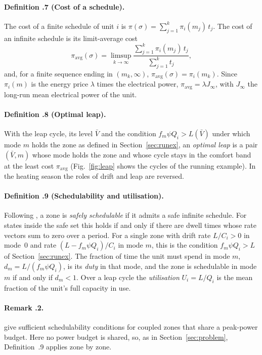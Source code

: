 \documentclass[10pt,a4paper,twocolumn]{article}
\theoremstyle{definition}
\begin{document}
\paragraph{Definition \thesection.7 (Cost of a schedule).} The cost of a finite schedule of unit $i$ is $\pi(\sigma)=\sum_{j=1}^k\pi_i(m_j)\,t_j$. The cost of an infinite schedule is its limit-average cost
\begin{equation*}
\pi_{\mathrm{avg}}(\sigma)=\limsup_{k\to\infty}\frac{\sum_{j=1}^k\pi_i(m_j)\,t_j}{\sum_{j=1}^kt_j},
\end{equation*}
and, for a finite sequence ending in $(m_k,\infty)$, $\pi_{\mathrm{avg}}(\sigma)=\pi_i(m_k)$. Since $\pi_i(m)$ is the energy price $\lambda$ times the electrical power, $\pi_{\mathrm{avg}}=\lambda J_\infty$, with $J_\infty$ the long-run mean electrical power of the unit.

\paragraph{Definition \thesection.8 (Optimal leap).} With the leap cycle, its level $\bar V$ and the condition $f_m\psi Q_i>L(\bar V)$ under which mode $m$ holds the zone as defined in Section~\ref{sec:runex}, an \emph{optimal leap} is a pair $(\bar V,m)$ whose mode holds the zone and whose cycle stays in the comfort band at the least cost $\pi_{\mathrm{avg}}$ (Fig.~\ref{fig:leap} shows the cycles of the running example). In the heating season the roles of drift and leap are reversed.

\paragraph{Definition \thesection.9 (Schedulability and utilisation).} Following \citet{alur2012optimal,alur2013safe}, a zone is \emph{safely schedulable} if it admits a safe infinite schedule. For states inside the safe set this holds if and only if there are dwell times whose rate vectors sum to zero over a period. For a single zone with drift rate $L/C_i>0$ in mode~0 and rate $(L-f_m\psi Q_i)/C_i$ in mode $m$, this is the condition $f_m\psi Q_i>L$ of Section~\ref{sec:runex}. The fraction of time the unit must spend in mode $m$, $d_m=L/(f_m\psi Q_i)$, is its \emph{duty} in that mode, and the zone is schedulable in mode $m$ if and only if $d_m<1$. Over a leap cycle the \emph{utilisation} $U_i=L/Q_i$ is the mean fraction of the unit's full capacity in use.

\paragraph{Remark \thesection.2.} \citet{nghiem2012scalable} give sufficient schedulability conditions for coupled zones that share a peak-power budget. Here no power budget is shared, so, as in Section~\ref{sec:problem}, Definition~\thesection.9 applies zone by zone.
\end{document}

